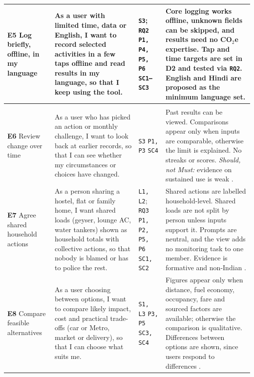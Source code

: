 \documentclass[12pt, a4paper]{article}
\newcommand{\co}{CO$_2$e}
\begin{document}
{\begin{longtable}{|>{\raggedright\arraybackslash}p{2.6cm}|>{\raggedright\arraybackslash}p{5.1cm}|>{\raggedright\arraybackslash}p{3.0cm}|>{\raggedright\arraybackslash}p{4.9cm}|}
\hline
\textbf{E5} Log briefly, offline, in my language &
As a user with limited time, data or English, I want to record selected activities in a few taps offline and read results in my language, so that I keep using the tool. &
\texttt{S3}; \texttt{RQ2} \newline \texttt{P1, P4, P5, P6} \newline \texttt{SC1--SC3} &
Core logging works offline, unknown fields can be skipped, and results need no \co{} expertise. Tap and time targets are set in D2 and tested via \texttt{RQ2}. English and Hindi are proposed as the minimum language set. \\
\hline

\rowcolor{cTeal}\multicolumn{4}{|l|}{\textcolor{white}{\textbf{SHOULD HAVE: comparison, repeat use and shared action}}} \\
\hline
\textbf{E6} Review change over time &
As a user who has picked an action or monthly challenge, I want to look back at earlier records, so that I can see whether my circumstances or choices have changed. &
\texttt{S3} \newline \texttt{P1, P3} \newline \texttt{SC4} &
Past results can be viewed. Comparisons appear only when inputs are comparable, otherwise the limit is explained. No streaks or scores. \emph{Should, not Must:} evidence on sustained use is weak \cite{froehlich2010, hoffmann2024}. \\
\hline
\textbf{E7} Agree shared household actions &
As a person sharing a hostel, flat or family home, I want shared loads (geyser, lounge AC, water tankers) shown as household totals with collective actions, so that nobody is blamed or has to police the rest. &
\texttt{L1, L2}; \texttt{RQ3} \newline \texttt{P1, P2, P5, P6} \newline \texttt{SC1, SC2} &
Shared actions are labelled household-level. Shared loads are not split by person unless inputs support it. Prompts are neutral, and the view adds no monitoring task to one member. Evidence is formative and non-Indian \cite{froehlich2012, tiefenbeck2019}. \\
\hline
\textbf{E8} Compare feasible alternatives &
As a user choosing between options, I want to compare likely impact, cost and practical trade-offs (car or Metro, market or delivery), so that I can choose what suits me. &
\texttt{S1, L3} \newline \texttt{P3, P5} \newline \texttt{SC3, SC4} &
Figures appear only when distance, fuel economy, occupancy, fare and sourced factors are available; otherwise the comparison is qualitative. Differences between options are shown, since users respond to differences \cite{mohanty2023}. \\
\hline


\end{longtable}}
\end{document}
